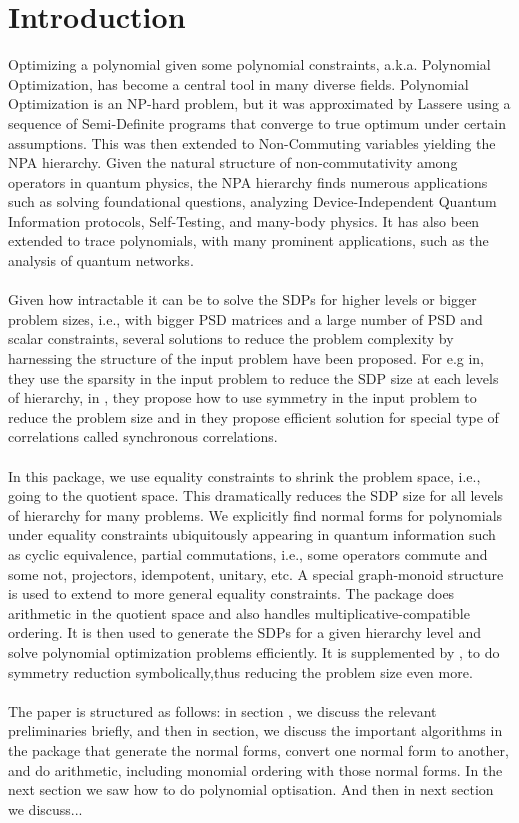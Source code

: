 \section{Introduction}
Optimizing a polynomial given some polynomial constraints, a.k.a. Polynomial Optimization, has become a central tool in many diverse fields. Polynomial Optimization is an NP-hard problem, but it was approximated by Lassere using a sequence of Semi-Definite programs that converge to true optimum under certain assumptions. This was then extended to Non-Commuting variables yielding the NPA hierarchy. Given the natural structure of non-commutativity among operators in quantum physics, the NPA hierarchy finds numerous applications such as solving foundational questions, analyzing Device-Independent Quantum Information protocols, Self-Testing, and many-body physics. It has also been extended to trace polynomials, with many prominent applications, such as the analysis of quantum networks. \\~\\
Given how intractable it can be to solve the SDPs for higher levels or bigger problem sizes, i.e., with bigger PSD matrices and a large number of PSD and scalar constraints, several solutions to reduce the problem complexity by harnessing the structure of the input problem have been proposed. For e.g in, they use the sparsity in the input problem to reduce the SDP size at each levels of hierarchy, in , they propose how to use symmetry in the input problem to reduce the problem size and in they propose efficient solution for special type of correlations called synchronous correlations.\\~\\
In this package, we use equality constraints to shrink the problem space, i.e., going to the quotient space. This dramatically reduces the SDP size for all levels of hierarchy for many problems. We explicitly find normal forms for polynomials under equality constraints ubiquitously appearing in quantum information such as cyclic equivalence, partial commutations, i.e., some operators commute and some not, projectors, idempotent, unitary, etc. A special graph-monoid structure is used to extend to more general equality constraints. The package does arithmetic in the quotient space and also handles multiplicative-compatible ordering. It is then used to generate the SDPs for a given hierarchy level and solve polynomial optimization problems efficiently. It is supplemented by , to do symmetry reduction symbolically,thus reducing the problem size even more.\\~\\
The paper is structured as follows: in section , we discuss the relevant preliminaries briefly, and then in section, we discuss the important algorithms in the package that generate the normal forms, convert one normal form to another, and do arithmetic, including monomial ordering with those normal forms. In the next section we saw how to do polynomial optisation. And then in next section we discuss...

